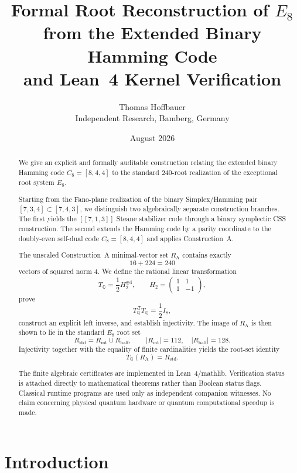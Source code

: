 \documentclass[11pt,a4paper]{article}
\title{
	Formal Root Reconstruction of $E_8$ from the Extended Binary Hamming Code\\
	and Lean~4 Kernel Verification
}
\author{
	Thomas Hoffbauer\\
	\small Independent Research, Bamberg, Germany
}
\date{August 2026}
\theoremstyle{definition}
\theoremstyle{remark}
\newcommand{\RA}{R_{\mathrm A}}
\newcommand{\Rstd}{R_{\mathrm{std}}}
\newcommand{\TQ}{T_{\mathbb Q}}
\begin{document}
	
	\maketitle
	
	
	\begin{abstract}
		We give an explicit and formally auditable construction relating the extended
		binary Hamming code $C_8=[8,4,4]$ to the standard $240$-root realization of
		the exceptional root system $E_8$.
		
		Starting from the Fano-plane realization of the binary Simplex/Hamming pair
		$[7,3,4]\subset[7,4,3]$, we distinguish two algebraically separate
		construction branches.  The first yields the $[[7,1,3]]$ Steane stabilizer
		code through a binary symplectic CSS construction.  The second extends the
		Hamming code by a parity coordinate to the doubly-even self-dual code
		$C_8=[8,4,4]$ and applies Construction~A.
		
		The unscaled Construction~A minimal-vector set $\RA$ contains exactly
		\[
		16+224=240
		\]
		vectors of squared norm $4$.  We define the rational linear transformation
		\[
		\TQ=\frac12 H_2^{\oplus4},
		\qquad
		H_2=
		\begin{pmatrix}
			1&1\\
			1&-1
		\end{pmatrix},
		\]
		prove
		\[
		\TQ^{\,T}\TQ=\frac12I_8,
		\]
		construct an explicit left inverse, and establish injectivity.  The image of
		$\RA$ is then shown to lie in the standard $E_8$ root set
		\[
		\Rstd=R_{\mathrm{int}}\cup R_{\mathrm{half}},
		\qquad
		|R_{\mathrm{int}}|=112,\quad |R_{\mathrm{half}}|=128.
		\]
		Injectivity together with the equality of finite cardinalities yields the
		root-set identity
		\[
		\TQ(\RA)=\Rstd.
		\]
		
		The finite algebraic certificates are implemented in Lean~4/mathlib.
		Verification status is attached directly to mathematical theorems rather
		than Boolean status flags.  Classical runtime programs are used only as
		independent companion witnesses.  No claim concerning physical quantum
		hardware or quantum computational speedup is made.
	\end{abstract}
	
	\section{Introduction}
	
\end{document}
